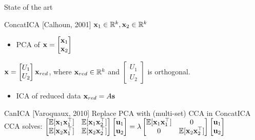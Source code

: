 \documentclass[bigger]{beamer}
\begin{document}
\begin{frame}{State of the art}
\begin{block}{ConcatICA [Calhoun, 2001]}
  \(\mathbf{x}_1 \in \mathbb{R}^{k}, \mathbf{x}_2 \in \mathbb{R}^{k}\)
  \begin{itemize}
  \item PCA of \(\mathbf{x} = \begin{bmatrix} \mathbf{x}_1 \\ \mathbf{x}_2 \end{bmatrix}\)
  \end{itemize}
  \(\mathbf{x} = \begin{bmatrix} U_1 \\ U_2 \end{bmatrix}  \mathbf{x}_{red} \), 
  where \( \mathbf{x}_{red}  \in \mathbb{R}^{k}\) and 
  \(\begin{bmatrix} U_1 \\ U_2 \end{bmatrix}\)
  is orthogonal.
  \begin{itemize}
  \item ICA of reduced data \( \mathbf{x}_{red}  = A \mathbf{s}\)
  \end{itemize}
\end{block}
\begin{block}{CanICA [Varoquaux, 2010]}
  Replace PCA with (multi-set) CCA in ConcatICA \\
  CCA solves:
  $\begin{bmatrix} \mathbb{E}[\mathbf{x}_1 \mathbf{x}_1^{\top}] & \mathbb{E}[\mathbf{x}_1 \mathbf{x}_2^{\top}] \\
    \mathbb{E}[\mathbf{x}_2 \mathbf{x}_1^{\top}] & \mathbb{E}[\mathbf{x}_2 \mathbf{x}_2^{\top}]\end{bmatrix} \begin{bmatrix}
    \mathbf{u}_1 \\ \mathbf{u}_2 \end{bmatrix} =
  \lambda \begin{bmatrix} \mathbb{E}[\mathbf{x}_1 \mathbf{x}_1^{\top}] & 0 \\
    0 & \mathbb{E}[\mathbf{x}_2 \mathbf{x}_2^{\top}]\end{bmatrix} \begin{bmatrix}
    \mathbf{u}_1 \\ \mathbf{u}_2 \end{bmatrix}$
\end{block}
\end{frame}
\end{document}
